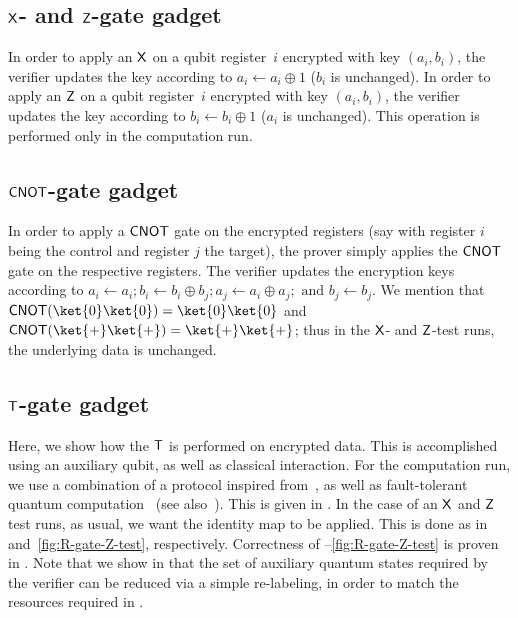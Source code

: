 \documentclass{toc}
\newcommand{\rgate}{{\sf T}}
\newcommand{\xgate}{{\sf X}}
\newcommand{\zgate}{{\sf Z}}
\newcommand{\cnot}{{\sf CNOT}}
\begin{document}
\subsection{\texorpdfstring{$\xgate$}{X}- and \texorpdfstring{$\zgate$}{Z}-gate gadget}
\label{sec:Pauli-gadget}
In order to apply an $\xgate$ on a qubit register~$i$ encrypted with key $(a_i,b_i)$, the verifier updates the key according to $a_i \leftarrow a_i \oplus 1$ ($b_i$ is unchanged). In order to apply an $\zgate$ on a qubit register~$i$ encrypted with key $(a_i,b_i)$, the verifier updates the key according to $b_i \leftarrow b_i \oplus 1$ ($a_i$ is unchanged).
This operation is performed only in the computation run.

\subsection{\texorpdfstring{$\cnot$}{CNOT}-gate gadget}
\label{sec:CNOT-gadget}
In order to apply a $\cnot$ gate on the encrypted registers (say with register $i$ being the control and register $j$ the target), the prover simply applies the $\cnot$ gate on the respective registers. The verifier updates the encryption keys according to
%
$a_i  \leftarrow a_i; b_i  \leftarrow b_i \oplus b_j;
a_j  \leftarrow a_i \oplus a_j; \text{ and }
b_j  \leftarrow b_j$.
%
We mention that $\cnot (\ket{0}\ket{0}) = \ket{0}\ket{0}$ and $\cnot (\ket{+}\ket{+})=\ket{+}\ket{+}$; thus in the $\xgate$- and $\zgate$-test runs, the underlying data is unchanged.

\subsection{\texorpdfstring{$\rgate$}{T}-gate gadget}
\label{sec:R-gadget}

Here, we show how the $\rgate$ is performed on encrypted data. This is accomplished using an auxiliary qubit, as well as classical interaction.
 For the computation run, we use a combination of a protocol inspired from~\cite{FBS+14,Bro15}, as well as fault-tolerant quantum computation~\cite{BMP+00} (see also~\cite{BJ15}). This is given in . In the case of an $\xgate$ and $\zgate$ test runs, as usual, we want the identity map to be applied. This is done as in  and~\ref{fig:R-gate-Z-test}, respectively. Correctness of --\ref{fig:R-gate-Z-test} is proven in . Note that we show in  that the set of auxiliary quantum states required by the verifier can be reduced via a simple re-labeling, in order to match the resources required in .
\end{document}
